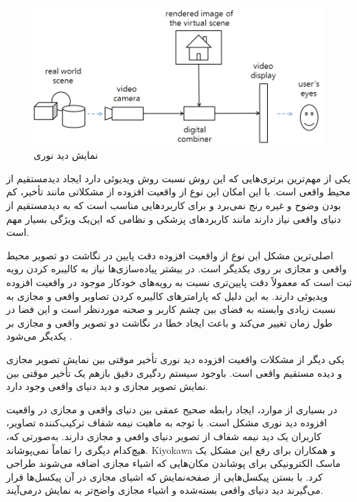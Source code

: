 \begin{figure}
	\centering
	\includegraphics[width=1\linewidth]{image/opticalview}
	\caption {نمایش دید نوری \cite{Billinghurst}}
	\label{fig:optical}
\end{figure}

یکی از مهم‌ترین برتری‌هایی که این روش نسبت روش ویدیوئی دارد ایجاد دیدمستقیم از محیط واقعی است. با این امکان این نوع از واقعیت افزوده از مشکلاتی مانند تأخیر، کم بودن وضوح و غیره رنج نمی‌برد و برای کاربردهایی مناسب است که به دیدمستقیم از دنیای واقعی نیاز دارند مانند کاربردهای پزشکی و نظامی که این‌یک ویژگی بسیار مهم است.

اصلی‌ترین مشکل این نوع از واقعیت افزوده دقت پایین در نگاشت دو تصویر محیط واقعی و مجازی بر روی یکدیگر است. در بیشتر پیاده‌سازی‌ها نیاز به کالیبره کردن رویه ثبت است که معمولاً دقت پایین‌تری نسبت به رویه‌های خودکار موجود در واقعیت افزوده ویدیوئی دارند. به این دلیل که پارامترهای کالیبره کردن تصاویر واقعی و مجازی به نسبت زیادی وابسته به فضای بین چشم کاربر و صحنه موردنظر است و این فضا در طول زمان تغییر می‌کند و باعث ایجاد خطا در نگاشت دو تصویر واقعی و مجازی بر یکدیگر می‌شود \cite{Billinghurst}.

یکی دیگر از مشکلات واقعیت افزوده دید نوری تأخیر موقتی بین نمایش تصویر مجازی و دیده مستقیم واقعی است. باوجود سیستم ردگیری دقیق بازهم یک تأخیر موقتی بین نمایش تصویر مجازی و دید دنیای واقعی وجود دارد.

در بسیاری از موارد، ایجاد رابطه صحیح عمقی بین دنیای واقعی و مجازی در واقعیت افزوده دید نوری مشکل است. با توجه به ماهیت نیمه شفاف ترکیب‌کننده تصاویر، کاربران یک دید نیمه شفاف از تصویر دنیای واقعی و مجازی دارند. به‌صورتی که، هیچ‌کدام دیگری را تماماً نمی‌پوشاند. Kiyokawa و همکاران\cite{Kiyokawa} برای رفع این مشکل یک ماسک الکترونیکی برای پوشاندن مکان‌هایی که اشیاء مجازی اضافه می‌شوند طراحی کرد. با بستن پیکسل‌هایی از صفحه‌نمایش که اشیای مجازی در آن پیکسل‌ها قرار می‌گیرند دید دنیای واقعی بسته‌شده و اشیاء مجازی واضح‌تر به نمایش درمی‌آیند.

